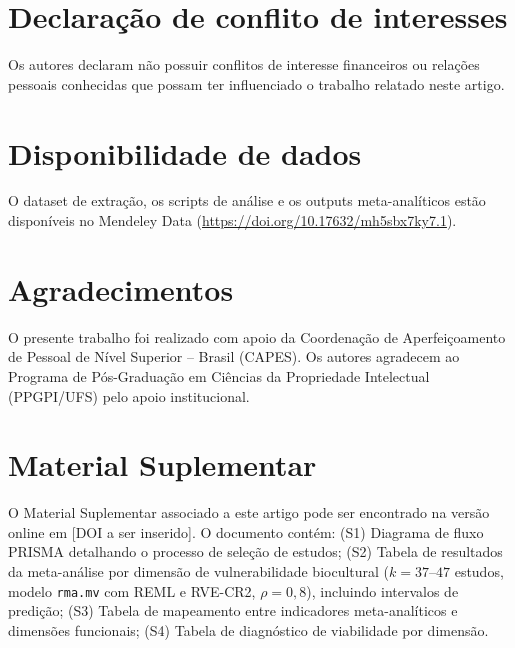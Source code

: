 \documentclass[12pt,a4paper]{article}
\begin{document}
\section*{Declaração de conflito de interesses}

Os autores declaram não possuir conflitos de interesse financeiros ou relações pessoais conhecidas que possam ter influenciado o trabalho relatado neste artigo.


\section*{Disponibilidade de dados}

O dataset de extração, os scripts de análise e os outputs meta-analíticos estão disponíveis no Mendeley Data (\url{https://doi.org/10.17632/mh5sbx7ky7.1}).


\section*{Agradecimentos}

O presente trabalho foi realizado com apoio da Coordenação de Aperfeiçoamento de Pessoal de Nível Superior -- Brasil (CAPES). Os autores agradecem ao Programa de Pós-Graduação em Ciências da Propriedade Intelectual (PPGPI/UFS) pelo apoio institucional.


\section*{Material Suplementar}

O Material Suplementar associado a este artigo pode ser encontrado na versão online em [DOI a ser inserido]. O documento contém: (S1) Diagrama de fluxo PRISMA detalhando o processo de seleção de estudos; (S2) Tabela de resultados da meta-análise por dimensão de vulnerabilidade biocultural ($k = 37$--$47$ estudos, modelo \texttt{rma.mv} com REML e RVE-CR2, $\rho = 0{,}8$), incluindo intervalos de predição; (S3) Tabela de mapeamento entre indicadores meta-analíticos e dimensões funcionais; (S4) Tabela de diagnóstico de viabilidade por dimensão.


\end{document}
